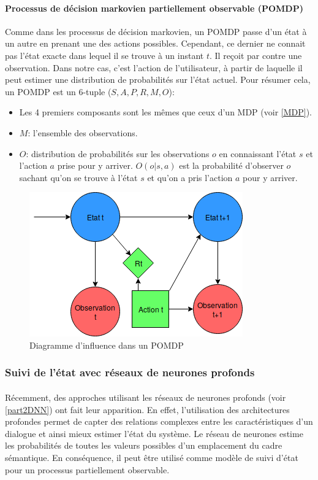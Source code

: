 \paragraph{Processus de décision markovien partiellement observable (POMDP)}
Comme dans les processus de décision markovien, un POMDP\cite{Astrom1965} passe d’un état à un autre en prenant une des actions possibles. Cependant, ce dernier ne connait pas l’état exacte dans lequel il se trouve à un instant $t$. Il reçoit par contre une observation. Dans notre cas, c’est l’action de l’utilisateur, à partir de laquelle il peut estimer une distribution de probabilités sur l’état actuel. Pour résumer cela, un POMDP est un 6-tuple ($S,A,P,R,M,O$):
\begin{itemize}
\item Les 4 premiers composants sont les mêmes que ceux d’un MDP (voir \ref{MDP}).
\item $M$: l’ensemble des observations.
\item $O$: distribution de probabilités sur les observations $o$ en connaissant l’état $s$ et l’action $a$ prise pour y arriver. $O(o|s,a)$ est la probabilité d’observer $o$ sachant qu’on se trouve à l’état $s$ et qu’on a pris l’action $a$ pour y arriver.
\end{itemize}

\begin{figure}[H]
	\centering
	\includegraphics[width=.5\linewidth]{images/DM/POMDP.png} 
	\caption{Diagramme d'influence dans un POMDP} 
\end{figure}

\subsubsection{Suivi de l’état avec réseaux de neurones profonds}
\paragraph{}
Récemment, des approches utilisant les réseaux de neurones profonds (voir \ref{part2DNN}) ont fait leur apparition. En effet, l'utilisation des architectures profondes permet de capter des relations complexes entre les caractéristiques d'un dialogue et ainsi mieux estimer l'état du système. Le réseau de neurones estime les probabilités de toutes les valeurs possibles d’un emplacement du cadre sémantique\cite{Henderson2013}. En conséquence, il peut être utilisé comme modèle de suivi d'état pour un processus partiellement observable.

